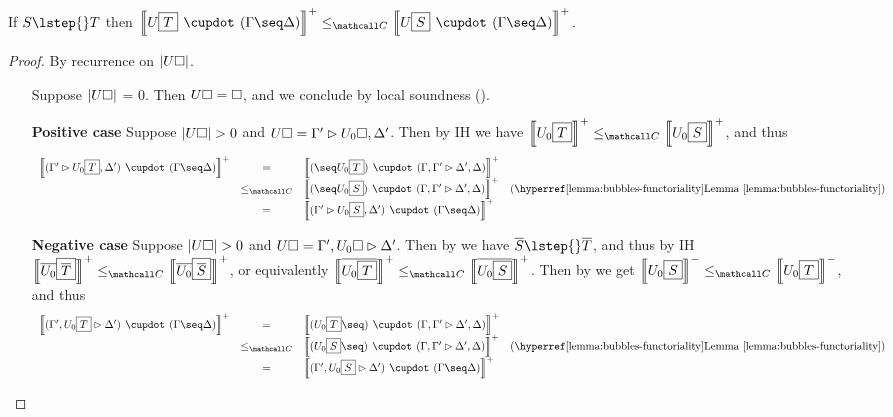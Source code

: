 \begin{lemma}

  If $S \lstep{} T$ then $\psint{U\select{T} \mix (\Gamma \seq \Delta)} \sementC
  \psint{U\select{S} \mix (\Gamma \seq \Delta)}$.
\end{lemma}
\begin{proof}
  By recurrence on $\left|U\square\right|$.
  \begin{itemize}
    \item[\bcase] Suppose $\left|U\square\right|$ = 0. Then $U\square =
    \square$, and we conclude by local soundness
    ().
    \item[\textbf{Positive case}] Suppose $\left|U\square\right| > 0$ and $U\square =
    \Gamma' \mathbin{\rhd} U_0\square, \Delta'$. Then by IH we have $\psint{U_0\select{T}}
    \sementC \psint{U_0\select{S}}$, and thus
    $$
    \begin{array}{rcll}
      \psint{(\Gamma' \J U_0\select{T}, \Delta') \mix (\Gamma \seq \Delta)}
      &=& \psint{(\seq U_0\select{T}) \mix (\Gamma, \Gamma' \J \Delta', \Delta)} &\\
      &\sementC& \psint{(\seq U_0\select{S}) \mix (\Gamma, \Gamma' \J \Delta', \Delta)} &\text{(\reflemma{bubbles-functoriality})}\\
      &=& \psint{(\Gamma' \J U_0\select{S}, \Delta') \mix (\Gamma \seq \Delta)} &
    \end{array}
    $$

    \item[\textbf{Negative case}] Suppose $\left|U\square\right| > 0$ and $U\square =
    \Gamma', U_0\square \mathbin{\rhd} \Delta'$. Then by  we have
    $\soldual{S} \lstep{} \soldual{T}$, and thus by IH
    $\psint{\soldual{U_0}\select{\soldual{T}}} \sementC
    \psint{\soldual{U_0}\select{\soldual{S}}}$, or equivalently
    $\psint{\soldual{U_0\select{T}}} \sementC \psint{\soldual{U_0\select{S}}}$.
    Then by  we get $\nsint{U_0\select{S}} \sementC
    \nsint{U_0\select{T}}$, and thus
    $$
    \begin{array}{rcll}
      \psint{(\Gamma', U_0\select{T} \J \Delta') \mix (\Gamma \seq \Delta)}
      &=& \psint{(U_0\select{T} \seq) \mix (\Gamma, \Gamma' \J \Delta', \Delta)} &\\
      &\sementC& \psint{(U_0\select{S} \seq) \mix (\Gamma, \Gamma' \J \Delta', \Delta)} &\text{(\reflemma{bubbles-functoriality})}\\
      &=& \psint{(\Gamma', U_0\select{S} \J \Delta') \mix (\Gamma \seq \Delta)} &
    \end{array}
    $$


\end{itemize}
\end{proof}
